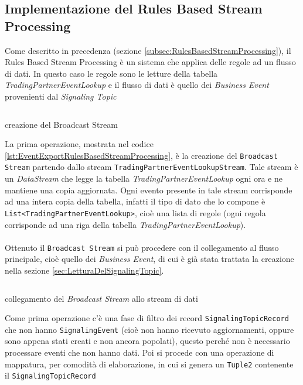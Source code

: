 \subsection{Implementazione del Rules Based Stream Processing}
\label{subsec:ImplementazioneDelRulesBasedStreamProcessing}
Come descritto in precedenza (sezione \ref{subsec:RulesBasedStreamProcessing}), il Rules Based Stream Processing è un sistema che applica delle regole ad un flusso di dati.
In questo caso le regole sono le letture della tabella \textit{TradingPartnerEventLookup} e il flusso di dati è quello dei \textit{Business Event} provenienti dal \textit{Signaling Topic}
\begin{code}
    \inputminted[linenos,fontsize=\footnotesize]{java}{listings/EventsExport/TradingPartnerBroadcast.java}
    \caption{creazione del Broadcast Stream}
    \label{lst:EventExportRulesBasedStreamProcessing}
\end{code}
La prima operazione, mostrata nel codice \ref{lst:EventExportRulesBasedStreamProcessing}, è la creazione del \texttt{Broadcast Stream} partendo dallo stream \texttt{TradingPartnerEventLookupStream}.
Tale stream è un \textit{DataStream} che legge la tabella \textit{TradingPartnerEventLookup} ogni ora e ne mantiene una copia aggiornata. 
Ogni evento presente in tale stream corrisponde ad una intera copia della tabella, infatti il tipo di dato che lo compone è \texttt{List<TradingPartnerEventLookup>}, 
cioè una lista di regole (ogni regola corrisponde ad una riga della tabella \textit{TradingPartnerEventLookup}).\\\\
Ottenuto il \texttt{Broadcast Stream} si può procedere con il collegamento al flusso principale, cioè quello dei \textit{Business Event},
di cui è già stata trattata la creazione nella sezione \ref{sec:LetturaDelSignalingTopic}. 
\begin{code}
    \inputminted[linenos,fontsize=\footnotesize]{java}{listings/EventsExport/StreamConnection.java}
    \caption{collegamento del \textit{Broadcast Stream} allo stream di dati}
    \label{lst:StreamsConnection}
\end{code}
Come prima operazione c'è una fase di filtro dei record \texttt{SignalingTopicRecord} che non hanno \texttt{SignalingEvent} (cioè non hanno ricevuto aggiornamenti, 
oppure sono appena stati creati e non ancora popolati), questo perché non è necessario processare eventi che non hanno dati.
Poi si procede con una operazione di mappatura, per comodità di elaborazione, in cui si genera un \texttt{Tuple2} contenente il \texttt{SignalingTopicRecord}
